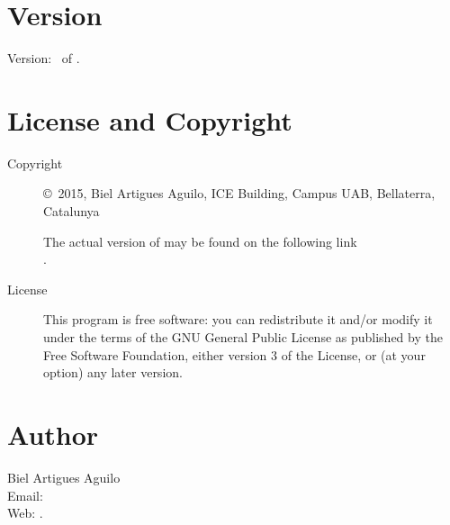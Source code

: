 \documentclass[a4paper,english]{article}
\begin{document}
\section{Version}

Version: \Version\ of \Date.

\section{License and Copyright}

\begin{description}
\item[Copyright] \copyright\ 2015, Biel Artigues Aguilo,
     ICE Building, Campus UAB, Bellaterra, Catalunya\\


     The actual version of   may be found on the following link\\
     .

\item[License] This program is free software: you can redistribute it and/or modify
    it under the terms of the GNU General Public License as published by
    the Free Software Foundation, either version 3 of the License, or
    (at your option) any later version.

\end{description}

\section{Author}

\noindent
Biel Artigues Aguilo                      \\
Email:   \\
Web: .

\LatexManEnd
\end{document}
